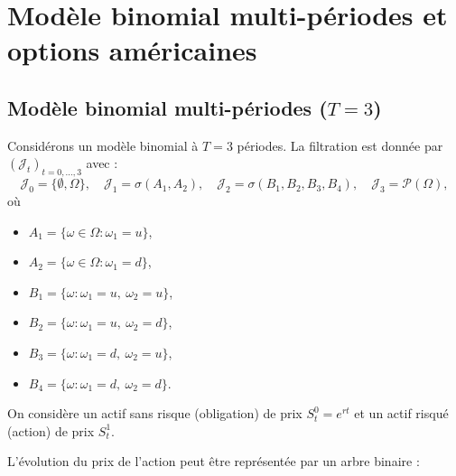 \chapter{Modèle binomial multi-périodes et options américaines}

\section{Modèle binomial multi-périodes ($T=3$)}

Considérons un modèle binomial à $T=3$ périodes.  
La filtration est donnée par $(\mathcal{J}_t)_{t=0,\dots,3}$ avec :
\[
\mathcal{J}_0=\{\emptyset,\Omega\},\quad
\mathcal{J}_1=\sigma(A_1,A_2),\quad
\mathcal{J}_2=\sigma(B_1,B_2,B_3,B_4),\quad
\mathcal{J}_3=\mathcal{P}(\Omega),
\]
où
\begin{itemize}
    \item $A_1 = \{\omega \in \Omega : \omega_1 = u\}$,
    \item $A_2 = \{\omega \in \Omega : \omega_1 = d\}$,
    \item $B_1 = \{\omega : \omega_1 = u,\ \omega_2 = u\}$,
    \item $B_2 = \{\omega : \omega_1 = u,\ \omega_2 = d\}$,
    \item $B_3 = \{\omega : \omega_1 = d,\ \omega_2 = u\}$,
    \item $B_4 = \{\omega : \omega_1 = d,\ \omega_2 = d\}$.
\end{itemize}

On considère un actif sans risque (obligation) de prix $S_t^0 = e^{rt}$  
et un actif risqué (action) de prix $S_t^1$.

L'évolution du prix de l'action peut être représentée par un arbre binaire :

